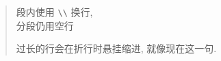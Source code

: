 \documentclass[nofonts]{ctexart}
\begin{document}
\begin{verse}
	段内使用 \verb=\\= 换行, 	\\
	分段仍用空行

	过长的行会在折行时悬挂缩进, 就像现在这一句.
\end{verse}
\end{document}
